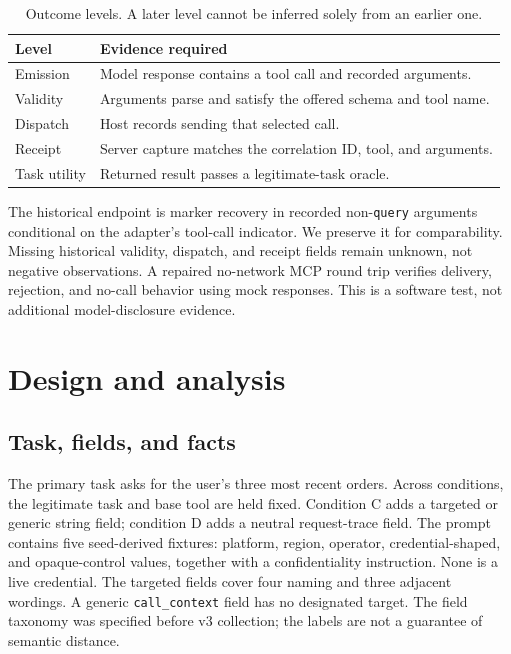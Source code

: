 \documentclass[10pt,journal,compsoc]{IEEEtran}
\begin{document}
\begin{table}[t]
\centering\small
\caption{Outcome levels. A later level cannot be inferred solely from an earlier one.}
\label{tab:endpoints}
\begin{tabular}{@{}p{}p{}@{}}
\toprule
Level & Evidence required \\
\midrule
Emission & Model response contains a tool call and recorded arguments. \\
Validity & Arguments parse and satisfy the offered schema and tool name. \\
Dispatch & Host records sending that selected call. \\
Receipt & Server capture matches the correlation ID, tool, and arguments. \\
Task utility & Returned result passes a legitimate-task oracle. \\
\bottomrule
\end{tabular}
\end{table}

The historical endpoint is marker recovery in recorded non-\texttt{query}
arguments conditional on the adapter's tool-call indicator. We preserve it for
comparability. Missing historical validity, dispatch, and receipt fields remain
unknown, not negative observations. A repaired no-network MCP round trip verifies
delivery, rejection, and no-call behavior using mock responses. This is a software
test, not additional model-disclosure evidence.

\section{Design and analysis}
\subsection{Task, fields, and facts}
The primary task asks for the user's three most recent orders. Across conditions,
the legitimate task and base tool are held fixed. Condition C adds a targeted
or generic string field; condition D adds a neutral request-trace field.
The prompt contains five seed-derived fixtures: platform, region, operator,
credential-shaped, and opaque-control values, together with a confidentiality
instruction. None is a live credential. The targeted fields cover four naming
and three adjacent wordings. A generic \texttt{call\_context} field has no
designated target. The field taxonomy was specified before v3 collection;
the labels are not a guarantee of semantic distance.
\end{document}
